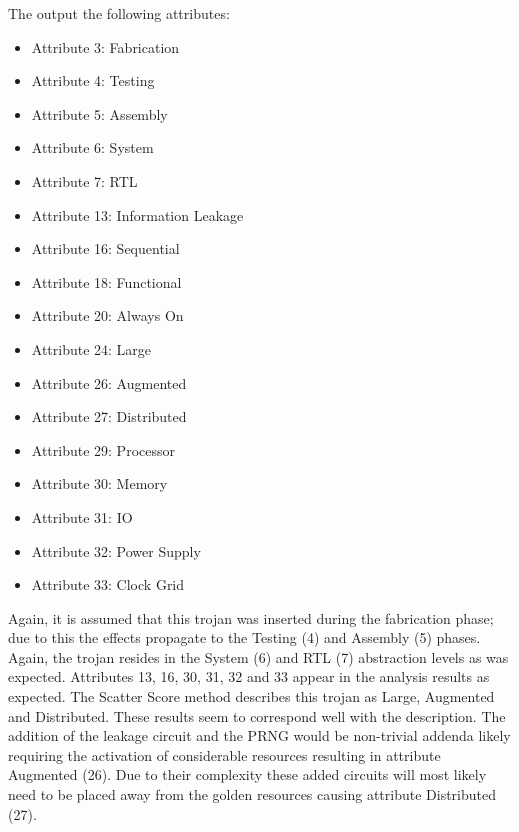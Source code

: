 The \NameNoPeriod output the following attributes:
\begin{itemize}
	\item Attribute 3: Fabrication
	\item Attribute 4: Testing
	\item Attribute 5: Assembly
	\item Attribute 6: System
	\item Attribute 7: RTL
	\item Attribute 13: Information Leakage
	\item Attribute 16: Sequential
	\item Attribute 18: Functional
	\item Attribute 20: Always On
	\item Attribute 24: Large
	\item Attribute 26: Augmented
	\item Attribute 27: Distributed
	\item Attribute 29: Processor
	\item Attribute 30: Memory
	\item Attribute 31: \acrshort{IO}
	\item Attribute 32: Power Supply
	\item Attribute 33: Clock Grid
\end{itemize}

Again, it is assumed that this trojan was inserted during the fabrication phase; due to this the effects propagate to the Testing (4) and Assembly (5) phases.
Again, the trojan resides in the System (6) and \acrshort{RTL} (7) abstraction levels as was expected.
Attributes 13, 16, 30, 31, 32 and 33 appear in the analysis results as expected.
The Scatter Score method describes this trojan as Large, Augmented and Distributed. 
These results seem to correspond well with the description. 
The addition of the leakage circuit and the PRNG would be non-trivial addenda likely requiring the activation of considerable resources resulting in attribute Augmented (26).
Due to their complexity these added circuits will most likely need to be placed away from the \gls{golden} resources causing attribute Distributed (27).

